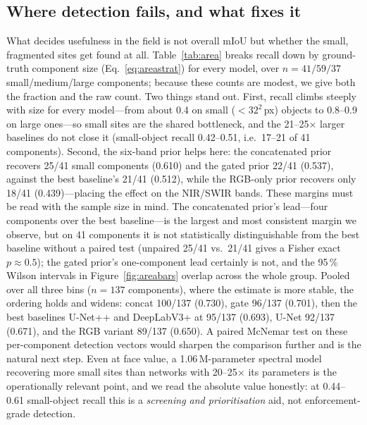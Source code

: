 \documentclass[review]{elsarticle}
\begin{document}
\subsection{Where detection fails, and what fixes it}\label{sec:results-area}
What decides usefulness in the field is not overall mIoU but whether the small, fragmented
sites get found at all. Table~\ref{tab:area} breaks recall down by ground-truth component
size (Eq.~\ref{eq:areastrat}) for every model, over $n=\num{41}/\num{59}/\num{37}$
small/medium/large components; because these counts are modest, we give both the fraction and
the raw count. Two things stand out. First, recall climbs steeply with size for every
model---from about \num{0.4} on small ($<32^2$\,px) objects to \num{0.8}--\num{0.9} on large
ones---so small sites are the shared bottleneck, and the \num{21}--\num{25}$\times$ larger
baselines do not close it (small-object recall \num{0.42}--\num{0.51}, i.e.\ \num{17}--\num{21}
of \num{41} components). Second, the six-band prior helps here: the concatenated prior
recovers \num{25}/\num{41} small components (\num{0.610}) and the gated prior \num{22}/\num{41}
(\num{0.537}), against the best baseline's \num{21}/\num{41} (\num{0.512}), while the RGB-only
prior recovers only \num{18}/\num{41} (\num{0.439})---placing the effect on the NIR/SWIR
bands. These margins must be read with the sample size in mind. The concatenated prior's
lead---four components over the best baseline---is the largest and most consistent margin we
observe, but on \num{41} components it is not statistically distinguishable from the best
baseline without a paired test (unpaired \num{25}/\num{41} vs.\ \num{21}/\num{41} gives a
Fisher exact $p\approx0.5$); the gated prior's one-component lead certainly is not, and the
\num{95}\,\% Wilson intervals in Figure~\ref{fig:areabars} overlap across the whole group.
Pooled over all three bins ($n=\num{137}$ components), where the estimate is more stable, the
ordering holds and widens: concat \num{100}/\num{137} (\num{0.730}), gate \num{96}/\num{137}
(\num{0.701}), then the best baselines U-Net++ and DeepLabV3+ at \num{95}/\num{137}
(\num{0.693}), U-Net \num{92}/\num{137} (\num{0.671}), and the RGB variant \num{89}/\num{137}
(\num{0.650}). A paired McNemar test on these per-component detection vectors would sharpen
the comparison further and is the natural next step. Even at face value, a
\num{1.06}\,M-parameter spectral model recovering more small sites than networks with
\num{20}--\num{25}$\times$ its parameters is the operationally relevant point, and we read the
absolute value honestly: at \num{0.44}--\num{0.61} small-object recall this is a
\emph{screening and prioritisation} aid, not enforcement-grade detection.
\end{document}
